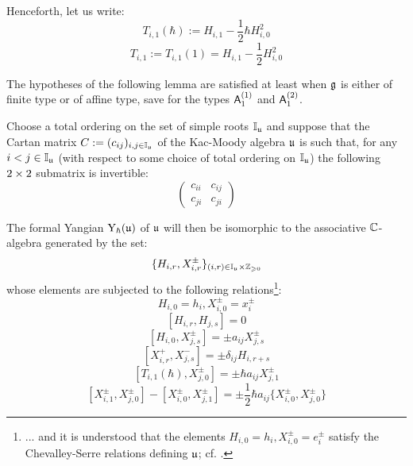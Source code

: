         \begin{convention}
            Henceforth, let us write:
                $$T_{i, 1}(\hbar) := H_{i, 1} - \frac12 \hbar H_{i, 0}^2$$
                $$T_{i, 1} := T_{i, 1}(1) = H_{i, 1} - \frac12 H_{i, 0}^2$$
        \end{convention}
        
        The hypotheses of the following lemma are satisfied at least when $\mathfrak{g}$ is either of finite type or of affine type, save for the types $\mathsf{A}_1^{(1)}$ and $\mathsf{A}_1^{(2)}$.
        \begin{lemma} \label{lemma: levendorskii_presentation}
            \cite[Theorem 2.13]{guay_nakajima_wendlandt_affine_yangian_coproduct} Choose a total ordering on the set of simple roots $\mathbb{I}_{\mathfrak{u}}$ and suppose that the Cartan matrix $C := (c_{ij})_{i, j \in \mathbb{I}_{\mathfrak{u}}}$ of the Kac-Moody algebra $\mathfrak{u}$ is such that, for any $i < j \in \mathbb{I}_{\mathfrak{u}}$ (with respect to some choice of total ordering on $\mathbb{I}_{\mathfrak{u}}$) the following $2 \x 2$ submatrix is invertible:
                $$
                    \begin{pmatrix}
                        c_{ii} & c_{ij}
                        \\
                        c_{ji} & c_{ji}
                    \end{pmatrix}
                $$
            
            The formal Yangian $\mathrm{Y}_{\hbar}(\mathfrak{u})$ of $\mathfrak{u}$ will then be isomorphic to the associative $\mathbb{C}$-algebra generated by the set:
                $$\{ H_{i, r}, X_{i, r}^{\pm} \}_{(i, r) \in \simpleroots_{\fraku} \x \Z_{\geq 0}}$$
            whose elements are subjected to the following relations\footnote{... and it is understood that the elements $H_{i, 0} = h_i, X_{i, 0}^{\pm} = e_i^{\pm}$ satisfy the Chevalley-Serre relations defining $\mathfrak{u}$; cf. \cite[Chapter 1]{kac_infinite_dimensional_lie_algebras}.}:
                $$H_{i, 0} = h_i, X_{i, 0}^{\pm} = x_i^{\pm}$$
                $$[ H_{i, r}, H_{j, s} ] = 0$$
                $$[ H_{i, 0}, X_{j, s}^{\pm} ] = \pm a_{ij} X_{j, s}^{\pm}$$
                $$[ X_{i, r}^+, X_{j, s}^- ] = \pm \delta_{ij} H_{i, r + s}$$
                $$\left[ T_{i, 1}(\hbar), X_{j, 0}^{\pm} \right] = \pm \hbar a_{ij} X_{j, 1}^{\pm}$$
                $$[ X_{i, 1}^{\pm}, X_{j, 0}^{\pm} ] - [ X_{i, 0}^{\pm}, X_{j, 1}^{\pm} ] = \pm \frac12 \hbar a_{ij} \{X_{i, 0}^{\pm}, X_{j, 0}^{\pm}\}$$
        \end{lemma}

